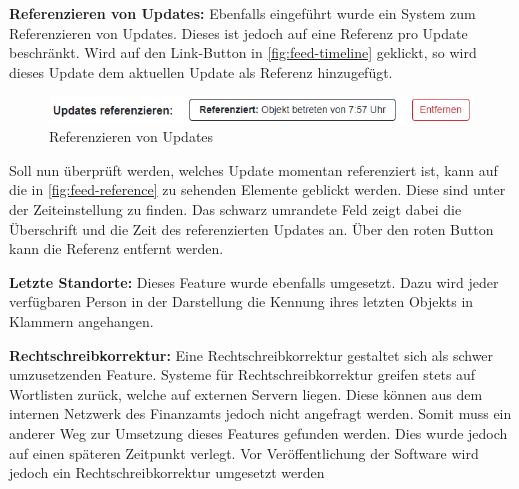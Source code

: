 \textbf{Referenzieren von Updates:} Ebenfalls eingeführt wurde ein System zum Referenzieren von Updates.
Dieses ist jedoch auf eine Referenz pro Update beschränkt.
Wird auf den Link-Button in \autoref{fig:feed-timeline} geklickt, so wird dieses Update dem aktuellen Update als Referenz hinzugefügt.

\begin{figure}[htp]
    \centering
    \includegraphics[width=\textwidth]{images/4-Feedback/reference.png}
    \caption{Referenzieren von Updates}
    \label{fig:feed-reference}
\end{figure}

Soll nun überprüft werden, welches Update momentan referenziert ist, kann auf die in \autoref{fig:feed-reference} zu sehenden Elemente geblickt werden.
Diese sind unter der Zeiteinstellung zu finden.
Das schwarz umrandete Feld zeigt dabei die Überschrift und die Zeit des referenzierten Updates an. Über den roten Button kann die Referenz entfernt werden.

\textbf{Letzte Standorte:} Dieses Feature wurde ebenfalls umgesetzt.
Dazu wird jeder verfügbaren Person in der Darstellung die Kennung ihres letzten Objekts in Klammern angehangen.

\textbf{Rechtschreibkorrektur:} Eine Rechtschreibkorrektur gestaltet sich als schwer umzusetzenden Feature.
Systeme für Rechtschreibkorrektur greifen stets auf Wortlisten zurück, welche auf externen Servern liegen.
Diese können aus dem internen Netzwerk des Finanzamts jedoch nicht angefragt werden.
Somit muss ein anderer Weg zur Umsetzung dieses Features gefunden werden.
Dies wurde jedoch auf einen späteren Zeitpunkt verlegt.
Vor Veröffentlichung der Software wird jedoch ein Rechtschreibkorrektur umgesetzt werden